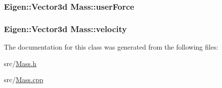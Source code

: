 \subsubsection[{user\+Force}]{\setlength{\rightskip}{0pt plus 5cm}Eigen\+::\+Vector3d Mass\+::user\+Force\hspace{0.3cm}{\ttfamily [private]}}\label{classMass_a2e7622d21617bdbf3939ee2ec5784b6d}
\hypertarget{classMass_ad6fe847559d3f2b4563df4fa3f08f101}{}
\subsubsection[{velocity}]{\setlength{\rightskip}{0pt plus 5cm}Eigen\+::\+Vector3d Mass\+::velocity\hspace{0.3cm}{\ttfamily [private]}}\label{classMass_ad6fe847559d3f2b4563df4fa3f08f101}


The documentation for this class was generated from the following files\+:\begin{DoxyCompactItemize}
\item 
src/\hyperlink{Mass_8h}{Mass.\+h}\item 
src/\hyperlink{Mass_8cpp}{Mass.\+cpp}\end{DoxyCompactItemize}

